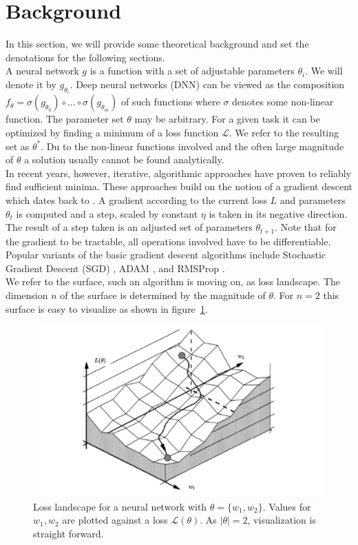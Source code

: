 \documentclass[a4paper]{scrartcl}
\begin{document}
\section*{Background}
In this section, we will provide some theoretical background and set the denotations for the following sections.\\
A neural network $g$ is a function with a set of adjustable parameters $\theta_i$. We will denote it by $g_{\theta_i}$. Deep neural networks (DNN) can be viewed as the composition $f_{\theta} = \sigma (g_{\theta_0}) \circ ... \circ \sigma(g_{\theta_m})$ of such functions where $\sigma$ denotes some non-linear function. The parameter set $\theta$ may be arbitrary. For a given task it can be optimized by finding a minimum of a loss function $\mathcal{L}$. We refer to the resulting set as $\theta^*$. Du to the non-linear functions involved and the often large magnitude of $\theta$ a solution usually cannot be found analytically.\\
In recent years, however, iterative, algorithmic approaches have proven to reliably find sufficient minima. These approaches build on the notion of a gradient descent which dates back to \citet{cauchy1847methode}. A gradient according to the current loss $L$ and parameters $\theta_t$ is computed and a step, scaled by constant $\eta$ is taken in its negative direction. The result of a step taken is an adjusted set of parameters $\theta_{t+1}$. Note that for the gradient to be tractable, all operations involved have to be differentiable. Popular variants of the basic gradient descent algorithms include Stochastic Gradient Descent (SGD) \cite{robbins1951stochastic}, ADAM \cite{kingma2014adam}, and RMSProp \cite{graves2013generating}.\\
We refer to the surface, such an algorithm is moving on, as loss landscape. The dimension $n$ of the surface is determined by the magnitude of $\theta$. For $n=2$ this surface is easy to visualize as shown in figure~\ref{fig:twoweights}.


\begin{figure}
	\centering
	\includegraphics[width=.6\linewidth]{figures/two_weight_loss.pdf}
	\caption{Loss landscape for a neural network with $\theta = \lbrace w_1, w_2 \rbrace$. Values for $w_1, w_2$ are plotted against a loss $\mathcal{L}(\theta)$. As $|\theta| = 2$, visualization is straight forward.}
	\label{fig:twoweights}
\end{figure}
\end{document}
